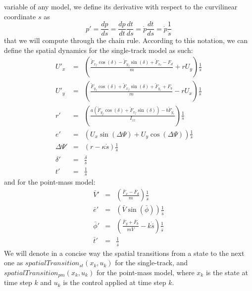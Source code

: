 \documentclass[a4paper, onecolumn, 12pt]{article}
\begin{document}
variable of any model, we define its derivative with respect to the curvilinear
coordinate $s$ as
\begin{equation}
    p' = \frac{d p}{d s} = \frac{dp}{dt} \frac{dt}{ds} = \dot{p} \frac{dt}{ds} = \dot{p} \frac{1}{\dot{s}}
\end{equation}  
that we will compute through the chain rule.
According to this notation, we can define the spatial dynamics for the single-track model as such:
\begin{subequations}
    \begin{eqnarray}
        U'_x &=& \left(\frac{\tilde{F}_{x_f}\cos(\delta)-\tilde{F}_{y_f}\sin(\delta)+\tilde{F}_{x_r}-F_d}{m}+rU_y\right) \frac{1}{\dot{s}}\\
        U'_y &=& \left(\frac{\tilde{F}_{y_f}\cos(\delta)+\tilde{F}_{x_f}\sin(\delta)+\tilde{F}_{y_r}+F_b}{m}-rU_x\right) \frac{1}{\dot{s}}\\
        r' &=& \left(\frac{a(\tilde{F}_{y_f}\cos(\delta)+\tilde{F}_{x_f}\sin(\delta))-b\tilde{F}_{y_r}}{I_{zz}}\right) \frac{1}{\dot{s}}\\
        e' &=& \left(U_x\sin(\Delta \varPsi)+U_y \cos(\Delta \varPsi)\right) \frac{1}{\dot{s}}\\
        \Delta \varPsi' &=& \left(r-\kappa \dot{s}\right) \frac{1}{\dot{s}}\\
        \delta ' &=& \frac{\dot{\delta}}{\dot{s}}\\
        t' &=& \frac{1}{\dot{s}}
    \end{eqnarray}
\end{subequations}
and for the point-mass model:
\begin{subequations}
    \begin{eqnarray}
        {\bar{V}}' &=& \left(\frac{\bar{F}_{x}-\bar{F}_{d}}{m}\right) \frac{1}{\dot{\bar{s}}}\\
        {\bar{e}}' &=& \left(\bar{V}\sin(\bar{\phi})\right)\frac{1}{\dot{\bar{s}}}\\
        {\bar{\phi}}' &=& \left(\frac{{\bar{F}}_y + {\bar{F}}_b}{m\bar{V}} - k\dot{\bar{s}}\right)\frac{1}{\dot{\bar{s}}}\\
        \bar{t}' &=& \frac{1}{\dot{\bar{s}}}
    \end{eqnarray}
\end{subequations}
We will denote in a concise way the spatial transitions from a state to the next one as
$spatialTransition_{st}(x_k, u_k)$ for the single-track, and $spatialTransition_{pm}(x_k, u_k)$ 
for the point-mass model, where $x_k$ is the state at time step $k$ and $u_k$ is the control
applied at time step $k$. 
\end{document}
